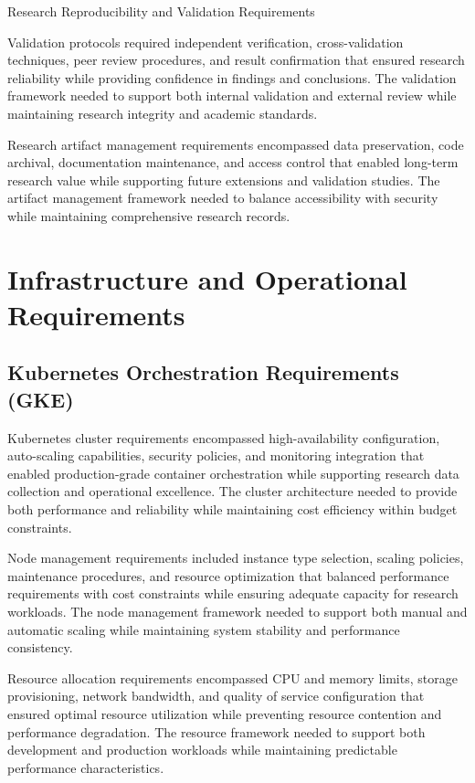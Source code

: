 \begin{table}[H]
\centering
\caption{Research Reproducibility and Validation Requirements}
\label{tab:reproducibility-framework}
\end{table}

Validation protocols required independent verification, cross-validation techniques, peer review procedures, and result confirmation that ensured research reliability while providing confidence in findings and conclusions. The validation framework needed to support both internal validation and external review while maintaining research integrity and academic standards.

Research artifact management requirements encompassed data preservation, code archival, documentation maintenance, and access control that enabled long-term research value while supporting future extensions and validation studies. The artifact management framework needed to balance accessibility with security while maintaining comprehensive research records.

\section{Infrastructure and Operational Requirements}

\subsection{Kubernetes Orchestration Requirements (GKE)}

Kubernetes cluster requirements encompassed high-availability configuration, auto-scaling capabilities, security policies, and monitoring integration that enabled production-grade container orchestration while supporting research data collection and operational excellence. The cluster architecture needed to provide both performance and reliability while maintaining cost efficiency within budget constraints.

Node management requirements included instance type selection, scaling policies, maintenance procedures, and resource optimization that balanced performance requirements with cost constraints while ensuring adequate capacity for research workloads. The node management framework needed to support both manual and automatic scaling while maintaining system stability and performance consistency.

Resource allocation requirements encompassed CPU and memory limits, storage provisioning, network bandwidth, and quality of service configuration that ensured optimal resource utilization while preventing resource contention and performance degradation. The resource framework needed to support both development and production workloads while maintaining predictable performance characteristics.

